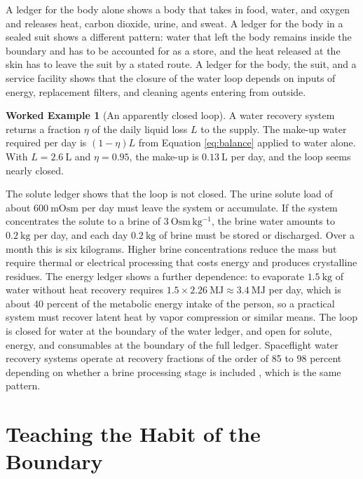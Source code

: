 \documentclass[11pt,openany]{book}
\theoremstyle{definition}
\newtheorem{example}{Worked Example}[chapter]
\theoremstyle{remark}
\begin{document}
A ledger for the body alone shows a body that takes in food, water, and oxygen and releases heat, carbon dioxide, urine, and sweat. A ledger for the body in a sealed suit shows a different pattern: water that left the body remains inside the boundary and has to be accounted for as a store, and the heat released at the skin has to leave the suit by a stated route. A ledger for the body, the suit, and a service facility shows that the closure of the water loop depends on inputs of energy, replacement filters, and cleaning agents entering from outside.

\begin{example}[An apparently closed loop]
\label{ex:closure}
A water recovery system returns a fraction $\eta$ of the daily liquid loss $L$ to the supply. The make-up water required per day is $(1-\eta)L$ from Equation \eqref{eq:balance} applied to water alone. With $L=2.6\ \mathrm{L}$ and $\eta=0.95$, the make-up is $0.13\ \mathrm{L}$ per day, and the loop seems nearly closed.

The solute ledger shows that the loop is not closed. The urine solute load of about $600\ \mathrm{mOsm}$ per day must leave the system or accumulate. If the system concentrates the solute to a brine of $3\ \mathrm{Osm\,kg^{-1}}$, the brine water amounts to $0.2\ \mathrm{kg}$ per day, and each day $0.2\ \mathrm{kg}$ of brine must be stored or discharged. Over a month this is six kilograms. Higher brine concentrations reduce the mass but require thermal or electrical processing that costs energy and produces crystalline residues. The energy ledger shows a further dependence: to evaporate $1.5\ \mathrm{kg}$ of water without heat recovery requires $1.5\times2.26\ \mathrm{MJ}\approx3.4\ \mathrm{MJ}$ per day, which is about 40 percent of the metabolic energy intake of the person, so a practical system must recover latent heat by vapor compression or similar means. The loop is closed for water at the boundary of the water ledger, and open for solute, energy, and consumables at the boundary of the full ledger. Spaceflight water recovery systems operate at recovery fractions of the order of 85 to 98 percent depending on whether a brine processing stage is included \cite{eckart1996}, which is the same pattern.
\end{example}

\section{Teaching the Habit of the Boundary}
\end{document}
